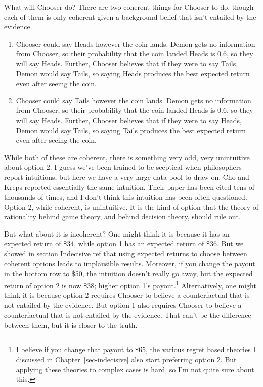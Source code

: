 \documentclass[
  12pt,
  letterpaper,
  DIV=11,
  numbers=noendperiod]{scrreprt}
\providecommand{\tightlist}{%
  \setlength{\itemsep}{0pt}\setlength{\parskip}{0pt}}\usepackage{longtable,booktabs,array}
\begin{document}
What will Chooser do? There are two coherent things for Chooser to do,
though each of them is only coherent given a background belief that
isn't entailed by the evidence.

\begin{enumerate}
\def\labelenumi{\arabic{enumi}.}
\tightlist
\item
  Chooser could say Heads however the coin lands. Demon gets no
  information from Chooser, so their probability that the coin landed
  Heads is 0.6, so they will say Heads. Further, Chooser believes that
  if they were to say Tails, Demon would say Tails, so saying Heads
  produces the best expected return even after seeing the coin.
\item
  Chooser could say Tails however the coin lands. Demon gets no
  information from Chooser, so their probability that the coin landed
  Heads is 0.6, so they will say Heads. Further, Chooser believes that
  if they were to say Heads, Demon would say Tails, so saying Tails
  produces the best expected return even after seeing the coin.
\end{enumerate}

While both of these are coherent, there is something very odd, very
unintuitive about option 2. I guess we've been trained to be sceptical
when philosophers report intuitions, but here we have a very large data
pool to draw on. Cho and Kreps reported essentially the same intuition.
Their paper has been cited tens of thousands of times, and I don't think
this intuition has been often questioned. Option 2, while coherent, is
unintuitive. It is the kind of option that the theory of rationality
behind game theory, and behind decision theory, should rule out.

But what about it is incoherent? One might think it is because it has an
expected return of \$34, while option 1 has an expected return of \$36.
But we showed in section Indecisive ref that using expected returns to
choose between coherent options leads to implausible results. Moreover,
if you change the payout in the bottom row to \$50, the intuition
doesn't really go away, but the expected return of option 2 is now \$38;
higher option 1's payout.\footnote{I believe if you change that payout
  to \$65, the various regret based theories I discussed in
  Chapter~\ref{sec-indecisive} also start preferring option 2. But
  applying these theories to complex cases is hard, so I'm not quite
  sure about this.} Alternatively, one might think it is because option
2 requires Chooser to believe a counterfactual that is not entailed by
the evidence. But option 1 also requires Chooser to believe a
counterfactual that is not entailed by the evidence. That can't be the
difference between them, but it is closer to the truth.
\end{document}
